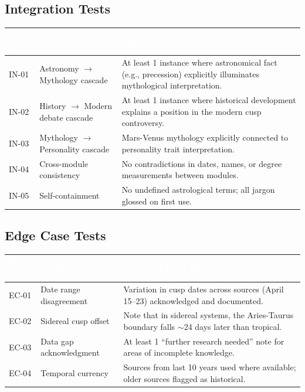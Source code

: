 \documentclass[11pt,letterpaper]{article}
\newcommand{\tableheader}[1]{\textbf{\sffamily\textcolor{white}{#1}}}
\begin{document}
\subsection{Integration Tests}

\begin{center}
\begin{tabularx}{\textwidth}{C{1.2cm}L{3.5cm}X}
\toprule
{}
\tableheader{Test ID} & \tableheader{Verifies} & \tableheader{Expected Behavior} \\
\midrule
IN-01 & Astronomy $\rightarrow$ Mythology cascade & At least 1 instance where astronomical fact (e.g., precession) explicitly illuminates mythological interpretation. \\
IN-02 & History $\rightarrow$ Modern debate cascade & At least 1 instance where historical development explains a position in the modern cusp controversy. \\
IN-03 & Mythology $\rightarrow$ Personality cascade & Mars-Venus mythology explicitly connected to personality trait interpretation. \\
IN-04 & Cross-module consistency & No contradictions in dates, names, or degree measurements between modules. \\
IN-05 & Self-containment & No undefined astrological terms; all jargon glossed on first use. \\
\bottomrule
\end{tabularx}
\end{center}

\subsection{Edge Case Tests}

\begin{center}
\begin{tabularx}{\textwidth}{C{1.2cm}L{3.5cm}X}
\toprule
{}
\tableheader{Test ID} & \tableheader{Verifies} & \tableheader{Expected Behavior} \\
\midrule
EC-01 & Date range disagreement & Variation in cusp dates across sources (April 15--23) acknowledged and documented. \\
EC-02 & Sidereal cusp offset & Note that in sidereal systems, the Aries-Taurus boundary falls $\sim$24 days later than tropical. \\
EC-03 & Data gap acknowledgment & At least 1 ``further research needed'' note for areas of incomplete knowledge. \\
EC-04 & Temporal currency & Sources from last 10 years used where available; older sources flagged as historical. \\
\bottomrule
\end{tabularx}
\end{center}
\end{document}
